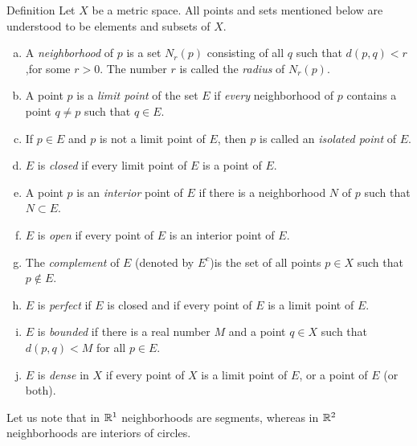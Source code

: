 \begin{myDef}\label{myDef:2.18}
    Definition Let $X$ be a metric space. All points and sets mentioned below are understood to be elements and subsets of $X$.
    \begin{enumerate}[(a)]
        \item A \emph{neighborhood} of $p$ is a set $N_r(p)$ consisting of all $q$ such that $d(p, q) < r$,for some $r > 0$. The number $r$ is called the \emph{radius} of $N_r(p)$.
        \item A point $p$ is a \emph{limit point} of the set $E$ if \emph{every} neighborhood of $p$ contains a point $q \neq p$ such that $q \in E$.
        \item If $p \in E$ and $p$ is not a limit point of $E$, then $p$ is called an \emph{isolated point} of $E$.
        \item $E$ is \emph{closed} if every limit point of $E$ is a point of $E$.
        \item A point $p$ is an \emph{interior} point of $E$ if there is a neighborhood $N$ of $p$ such that $N \subset E$.
        \item $E$ is \emph{open} if every point of $E$ is an interior point of $E$.
        \item The \emph{complement} of $E$ (denoted by $E^c$)is the set of all points $p \in X$ such that $p \not\in E$.
        \item $E$ is \emph{perfect} if $E$ is closed and if every point of $E$ is a limit point of $E$.
        \item $E$ is \emph{bounded} if there is a real number $M$ and a point $q \in X$ such that $d(p,q)< M$ for all $p \in E$.
        \item $E$ is \emph{dense} in $X$ if every point of $X$ is a limit point of $E$, or a point of $E$ (or both).
    \end{enumerate}
\end{myDef}

Let us note that in ${\protect\mathbb R}^1$ neighborhoods are segments, whereas in ${\protect\mathbb R}^2$ neighborhoods are interiors of circles.


